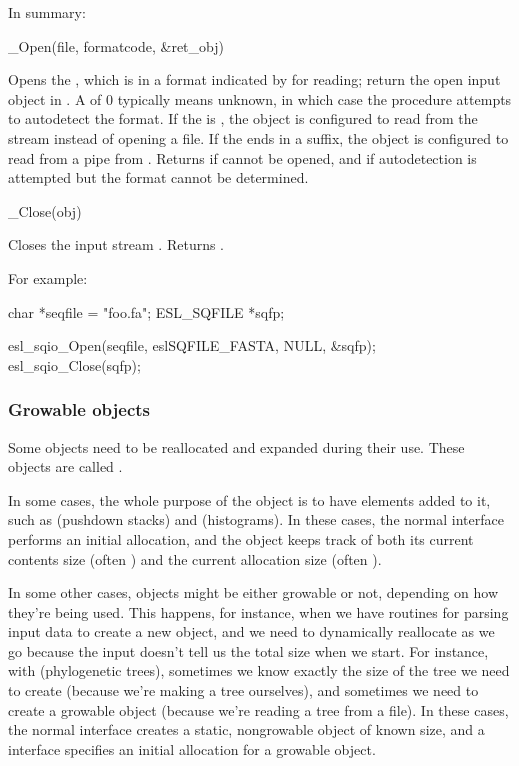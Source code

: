 In summary:

\begin{sreapi}
\hypertarget{ifc:Open} 
{\item[\_Open(file, formatcode, \&ret\_obj)]}

Opens the , which is in a format indicated by
 for reading; return the open input object in
. A  of 0 typically means unknown,
in which case the  procedure attempts to autodetect
the format. If the  is , the object is
configured to read from the  stream instead of opening a
file. If the  ends in a  suffix, the object is
configured to read from a pipe from . Returns
 if  cannot be opened, and
 if autodetection is attempted but the format cannot
be determined.

\hypertarget{ifc:Close} 
{\item[\_Close(obj)]}

Closes the input stream . Returns .
\end{sreapi}


For example:

\begin{cchunk}
    char        *seqfile = "foo.fa";
    ESL_SQFILE  *sqfp;

    esl_sqio_Open(seqfile, eslSQFILE_FASTA, NULL, &sqfp);
    esl_sqio_Close(sqfp);
\end{cchunk}



\subsubsection{Growable objects}

Some objects need to be reallocated and expanded during their use.
These objects are called .

In some cases, the whole purpose of the object is to have elements
added to it, such as  (pushdown stacks) and
 (histograms). In these cases, the normal
 interface performs an initial allocation, and the
object keeps track of both its current contents size (often
) and the current allocation size (often
). 

In some other cases, objects might be either growable or not,
depending on how they're being used. This happens, for instance, when
we have routines for parsing input data to create a new object, and we
need to dynamically reallocate as we go because the input doesn't tell
us the total size when we start. For instance, with 
(phylogenetic trees), sometimes we know exactly the size of the tree
we need to create (because we're making a tree ourselves), and
sometimes we need to create a growable object (because we're reading a
tree from a file). In these cases, the normal 
interface creates a static, nongrowable object of known size, and a
 interface specifies an initial allocation
for a growable object.

